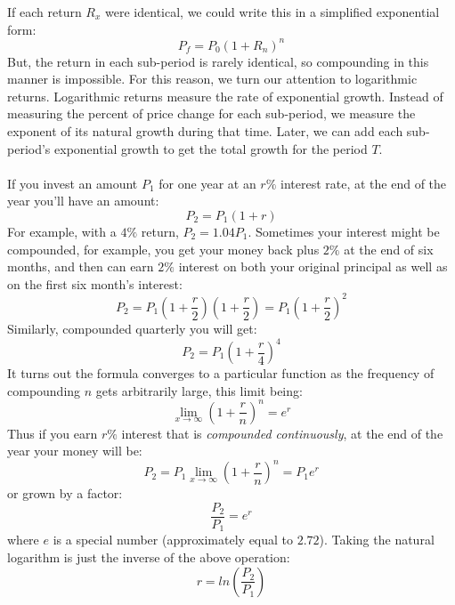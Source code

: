 \documentclass[11pt, oneside]{article}   	%
\begin{document}
If each return $R_x$ were identical, we could write this in a simplified exponential form:
\begin{equation}
	P_f =P_0(1+R_n)^n
\end{equation}	
But, the return in each sub-period is rarely identical, so compounding in this manner is impossible. For this reason, we turn our attention to logarithmic returns. Logarithmic returns measure the rate of exponential growth. Instead of measuring the percent of price change for each sub-period, we measure the exponent of its natural growth during that time. Later, we can add each sub-period's exponential growth to get the total growth for the period $T$.
\\
\\
If you invest an amount  $P_1$ for one year at an $r\%$ interest rate, at the end of the year you'll have an amount:
\begin{equation}
	P_2 = P_1(1+r)
\end{equation}
For example, with a $4\%$ return, $P_2 = 1.04P_1$. Sometimes your interest might be compounded, for example, you get your money back plus $2\%$ at the end of six months, and then can earn $2\%$  interest on both your original principal as well as on the  first six month's interest: 
\begin{equation}
	P_2 = P_1(1+\frac{r}{2})(1+\frac{r}{2}) = P_1(1+\frac{r}{2})^2
\end{equation}
Similarly, compounded quarterly you will get:
\begin{equation}
	P_2 = P_1(1+\frac{r}{4})^4
\end{equation}
It turns out the formula converges to a particular function as the frequency of compounding $n$ gets arbitrarily large, this limit being:
\begin{equation}
	\displaystyle{\lim_{x \to \infty}}(1 + \frac{r}{n})^n = e^r
\end{equation}
Thus if you earn $r\%$ interest that is \emph{compounded continuously}, at the end of the year your money will be:
\begin{equation}
	P_2 = P_1\displaystyle{\lim_{x \to \infty}}(1 + \frac{r}{n})^n = P_1e^r
\end{equation}
or grown by a factor:
\begin{equation}
	\frac{P_2}{P_1} = e^r
\end{equation}
where $e$ is a special number (approximately equal to $2.72$). Taking the natural logarithm is just the inverse of the above operation: 
\begin{equation}
	r = ln(\frac{P_2}{P_1})
\end{equation}
\end{document}
